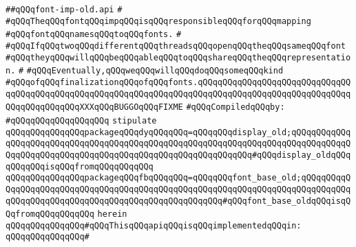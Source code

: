 \label{src/lib/x-kit/xclient/src/window/font-imp-old.api}
\verb|##qQQqfont-imp-old.api|\newline
\verb|#|\newline
\verb|#qQQqTheqQQqfontqQQqimpqQQqisqQQqresponsibleqQQqforqQQqmapping|\newline
\verb|#qQQqfontqQQqnamesqQQqtoqQQqfonts.|\newline
\verb|#|\newline
\verb|#qQQqIfqQQqtwoqQQqdifferentqQQqthreadsqQQqopenqQQqtheqQQqsameqQQqfont|\newline
\verb|#qQQqtheyqQQqwillqQQqbeqQQqableqQQqtoqQQqshareqQQqtheqQQqrepresentation.|\newline
\verb|#|\newline
\verb|#qQQqEventually,qQQqweqQQqwillqQQqdoqQQqsomeqQQqkind|\newline
\verb|#qQQqofqQQqfinalizationqQQqofqQQqfonts.qQQqqQQqqQQqqQQqqQQqqQQqqQQqqQQqqQQqqQQqqQQqqQQqqQQqqQQqqQQqqQQqqQQqqQQqqQQqqQQqqQQqqQQqqQQqqQQqqQQqqQQqqQQqqQQqqQQqXXXqQQqBUGGOqQQqFIXME|\newline
\newline
\verb|#qQQqCompiledqQQqby:|\newline
\verb|#qQQqqQQqqQQqqQQqqQQq|\newline
\newline
\verb|stipulate|\newline
\verb|qQQqqQQqqQQqqQQqpackageqQQqdyqQQqqQQq=qQQqqQQqdisplay_old;qQQqqQQqqQQqqQQqqQQqqQQqqQQqqQQqqQQqqQQqqQQqqQQqqQQqqQQqqQQqqQQqqQQqqQQqqQQqqQQqqQQqqQQqqQQqqQQqqQQqqQQqqQQqqQQqqQQqqQQqqQQqqQQqqQQq#qQQqdisplay_oldqQQqqQQqqQQqisqQQqfromqQQqqQQqqQQq|\newline
\verb|qQQqqQQqqQQqqQQqpackageqQQqfbqQQqqQQq=qQQqqQQqfont_base_old;qQQqqQQqqQQqqQQqqQQqqQQqqQQqqQQqqQQqqQQqqQQqqQQqqQQqqQQqqQQqqQQqqQQqqQQqqQQqqQQqqQQqqQQqqQQqqQQqqQQqqQQqqQQqqQQqqQQqqQQqqQQq#qQQqfont_base_oldqQQqisqQQqfromqQQqqQQqqQQq|\newline
\verb|herein|\newline
\newline
\verb|qQQqqQQqqQQqqQQq#qQQqThisqQQqapiqQQqisqQQqimplementedqQQqin:|\newline
\verb|qQQqqQQqqQQqqQQq#|\newline
